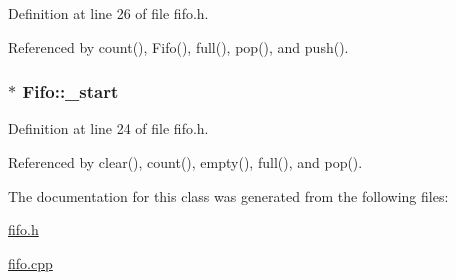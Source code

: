 Definition at line 26 of file fifo.h.



Referenced by count(), Fifo(), full(), pop(), and push().

\hypertarget{class_fifo_a440e9cfd5fd73a4f571a4027ff74d8d2}{
\subsubsection[{\_\-start}]{$\ast$ {\bf Fifo::\_\-start}}}
\label{class_fifo_a440e9cfd5fd73a4f571a4027ff74d8d2}


Definition at line 24 of file fifo.h.



Referenced by clear(), count(), empty(), full(), and pop().



The documentation for this class was generated from the following files:\begin{DoxyCompactItemize}
\item 
\hyperlink{fifo_8h}{fifo.h}\item 
\hyperlink{fifo_8cpp}{fifo.cpp}\end{DoxyCompactItemize}
